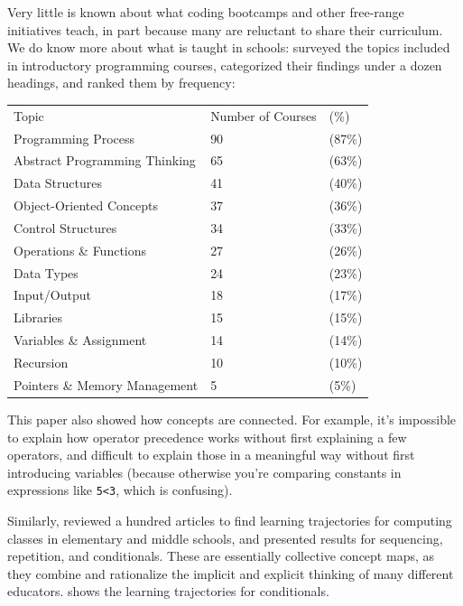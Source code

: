 
Very little is known about what coding bootcamps and other free-range
initiatives teach, in part because many are reluctant to share their
curriculum. We do know more about what is taught in schools:
\cite{Luxt2017} surveyed the topics included in introductory
programming courses, categorized their findings under a dozen headings,
and ranked them by frequency:

\begin{longtable}[]{@{}lll@{}}
Topic & Number of Courses & (\%)\\
Programming Process & 90 & (87\%)\\
Abstract Programming Thinking & 65 & (63\%)\\
Data Structures & 41 & (40\%)\\
Object-Oriented Concepts & 37 & (36\%)\\
Control Structures & 34 & (33\%)\\
Operations \& Functions & 27 & (26\%)\\
Data Types & 24 & (23\%)\\
Input/Output & 18 & (17\%)\\
Libraries & 15 & (15\%)\\
Variables \& Assignment & 14 & (14\%)\\
Recursion & 10 & (10\%)\\
Pointers \& Memory Management & 5 & (5\%)\\
\end{longtable}

This paper also showed how concepts are connected. For example, it's
impossible to explain how operator precedence works without first
explaining a few operators, and difficult to explain those in a
meaningful way without first introducing variables (because otherwise
you're comparing constants in expressions like \texttt{5\textless{}3}, which is
confusing).

Similarly, \cite{Rich2017} reviewed a hundred articles to find
learning trajectories for computing classes in elementary and middle
schools, and presented results for sequencing, repetition, and
conditionals. These are essentially collective concept maps, as they
combine and rationalize the implicit and explicit thinking of many
different educators.  shows the learning
trajectories for conditionals.


